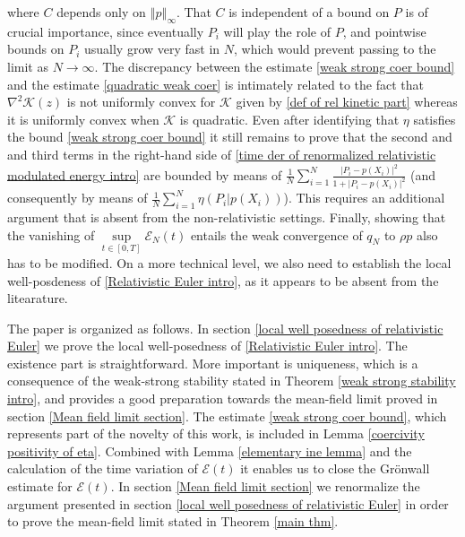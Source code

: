 \documentclass[11pt,reqno]{amsart}
\numberwithin{equation}{section}
\begin{document}
where $C$ depends only on $\left\Vert p\right\Vert_{\infty} $. That $C$ is independent of a bound on $P$ is of crucial importance, since eventually $P_{i}$ will play the role of $P$, and pointwise bounds on $P_{i}$ usually grow very fast in $N$, which would prevent passing to the limit as $N\rightarrow \infty$. The discrepancy between the estimate \eqref{weak strong coer bound} and the estimate \eqref{quadratic weak coer} is intimately related to the fact that $\nabla^{2}\mathscr{K}(z)$ is not uniformly convex for $\mathscr{K}$ given by \eqref{def of rel kinetic part} whereas it is uniformly convex when $\mathscr{K}$ is quadratic. Even after identifying that $\eta$ satisfies the bound \eqref{weak strong coer bound} it still remains to prove that the second and and third terms in the right-hand side of \eqref{time der of renormalized relativistic modulated energy intro} are bounded by means of $\frac{1}{N}\sum_{i=1}^{N}\frac{\left\vert P_{i}-p(X_{i})\right\vert^{2} }{1+\left\vert P_{i}-p(X_{i})\right\vert^{2} }$ (and consequently by means of $\frac{1}{N}\sum_{i=1}^{N}\eta(P_{i}\vert p(X_{i}))$). This requires an additional argument that is absent from the non-relativistic settings. Finally, showing that the vanishing of $\underset{t\in [0,T]}{\sup}\mathcal{E}_{N}(t)$ entails the weak convergence of $q_{N}$ to $\rho p$ also has to be modified. On a more technical level, we also need to establish the local well-posdeness of \eqref{Relativistic Euler intro}, as it appears to be absent from the litearature. 

\vspace{0.4 cm}

The paper is organized as follows. In section \ref{local well posedness of relativistic Euler} we prove the local well-posedness of \eqref{Relativistic Euler intro}. The existence part is straightforward. More important is uniqueness, which is a consequence of the weak-strong stability stated in Theorem \ref{weak strong stability intro}, and provides a good preparation towards the mean-field limit proved in section \ref{Mean field limit section}. The estimate \eqref{weak strong coer bound}, which represents part of the novelty of this work, is included in Lemma \ref{coercivity positivity of eta}. Combined with Lemma \ref{elementary ine lemma} and the calculation of the time variation of $\mathcal{E}(t)$ it enables us to close the Gr\"onwall estimate for $\mathcal{E}(t)$. In section \ref{Mean field limit section} we renormalize the argument presented in section \ref{local well posedness of relativistic Euler} in order to prove the mean-field limit stated in Theorem \ref{main thm}.        
\end{document}
